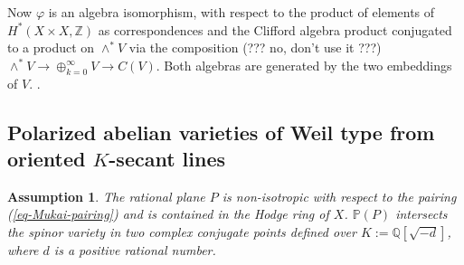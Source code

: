 \documentclass[12pt]{amsart}
\numberwithin{equation}{subsection}
\theoremstyle{plain}
\newtheorem{assumption}[thm]{Assumption}
\theoremstyle{definition}
\newcommand{\QQ}{{\mathbb Q}}
\newcommand{\ZZ}{{\mathbb Z}}
\newcommand{\PP}{{\mathbb P}}
\begin{document}
{{Now $\varphi$ is an algebra isomorphism, with respect to the product of elements of $H^*(X\times X,\ZZ)$ as correspondences
and the Clifford algebra product conjugated to a product on $\wedge^*V$ via the composition (??? no, don't use it ???)
$\wedge^*V\rightarrow \oplus_{k=0}^\infty V\rightarrow C(V)$.
Both algebras are generated by the two embeddings of $V$.
} 
\cite[Prop. 4.3.7(b)]{golyshev-luntz-orlov}.
}


% 
\subsection{Polarized abelian varieties of Weil type from oriented $K$-secant lines}
\label{sec-polarized-avwt-from-secants}
\begin{assumption} 
\label{assumption-on-rational-secant-plane-P}
The rational plane $P$ is non-isotropic with respect to the pairing (\ref{eq-Mukai-pairing}) and is contained in the Hodge ring of $X$. $\PP(P)$ intersects the spinor variety in two complex conjugate points defined over $K:=\QQ[\sqrt{-d}]$, where $d$ is a positive rational number.
\end{assumption}
\end{document}
